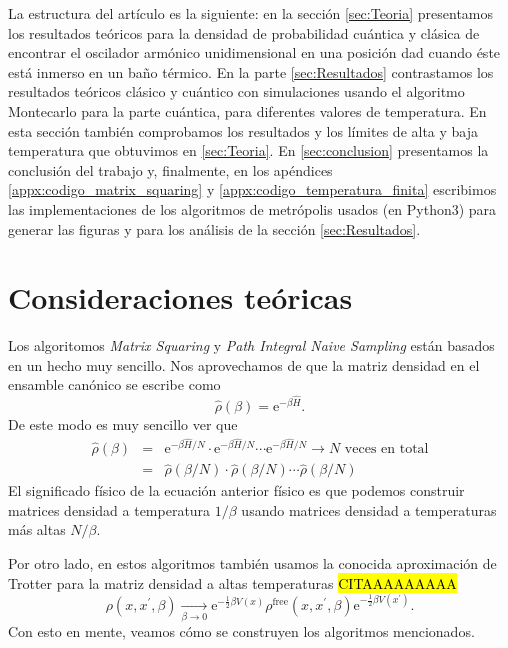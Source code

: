 \documentclass[%
 reprint,
 amsmath,amssymb,
 aps,
 pra,
]{revtex4-2}
\begin{document}
La estructura del artículo es la siguiente: en la sección \ref{sec:Teoria} presentamos los resultados teóricos para la densidad de probabilidad cuántica y clásica de encontrar el oscilador armónico unidimensional en una posición dad cuando éste está inmerso en un baño térmico. En la parte \ref{sec:Resultados} contrastamos los resultados teóricos clásico y cuántico con simulaciones usando el algoritmo Montecarlo para la parte cuántica, para diferentes valores de temperatura. En esta sección también comprobamos los resultados y los límites de alta y baja temperatura que obtuvimos en \ref{sec:Teoria}. En \ref{sec:conclusion} presentamos la conclusión del trabajo y, finalmente, en los apéndices \ref{appx:codigo_matrix_squaring} y \ref{appx:codigo_temperatura_finita} escribimos las implementaciones de los algoritmos de metrópolis usados (en Python3) para generar las figuras y para los análisis de la sección \ref{sec:Resultados}.


\section{\label{sec:Teoria}Consideraciones teóricas}

Los algoritomos \textit{Matrix Squaring} y \textit{Path Integral Naive Sampling} están basados en un hecho muy sencillo. Nos aprovechamos de que la matriz densidad en el ensamble canónico se escribe como 
\begin{equation}
	\hat{\rho}(\beta) = \mathrm{e}^{-\beta \hat{H}}.
\end{equation}
De este modo es muy sencillo ver que
\begin{eqnarray}
	\hat{\rho}(\beta) 	&=& \mathrm{e}^{-\beta\hat{H}/N} \cdot \mathrm{e}^{-\beta\hat{H}/N}  \cdots \mathrm{e}^{-\beta\hat{H}/N} \rightarrow \text{$N$ veces en total} \nonumber \\
						&=& \hat{\rho}(\beta/N) \cdot \hat{\rho}(\beta/N) \cdots \hat{\rho}(\beta/N) \label{eq:convolution} 
\end{eqnarray}
El significado físico de la ecuación anterior físico es que podemos construir matrices densidad a temperatura $1/\beta$ usando matrices densidad a temperaturas más altas $N/\beta$.
	

Por otro lado, en estos algoritmos también usamos la conocida aproximación de Trotter para la matriz densidad a altas temperaturas \hl{CITAAAAAAAAA}
\begin{equation}
	\rho\left(x, x^{\prime}, \beta\right) \underset{\beta \rightarrow 0}{\longrightarrow} \mathrm{e}^{-\frac{1}{2} \beta V(x)} \rho^{\mathrm{free}}\left(x, x^{\prime}, \beta\right) \mathrm{e}^{-\frac{1}{2} \beta V\left(x^{\prime}\right)}. \label{eq:trotter}
\end{equation}	
Con esto en mente, veamos cómo se construyen los algoritmos mencionados. 
\end{document}
